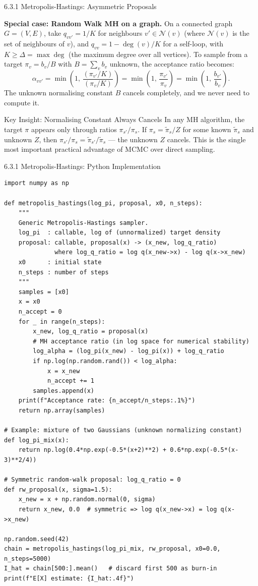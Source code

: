 \documentclass[aspectratio=169,10pt]{beamer}
\begin{document}
\begin{frame}[allowframebreaks]{6.3.1 Metropolis-Hastings: Asymmetric Proposals}
\framebreak

\textbf{Special case: Random Walk MH on a graph.}
On a connected graph $G = (V,E)$, take $q_{vv'} = 1/K$ for neighbours $v' \in \mathcal{N}(v)$ (where $\mathcal{N}(v)$ is the set of neighbours of $v$), and $q_{vv} = 1 - \deg(v)/K$ for a self-loop, with $K \ge \Delta = \max\deg$ (the maximum degree over all vertices).
To sample from a target $\pi_v = b_v/B$ with $B = \sum_v b_v$ unknown, the acceptance ratio becomes:
\[
  \alpha_{vv'} = \min\!\left(1,\, \frac{(\pi_{v'}/K)}{(\pi_v/K)}\right) = \min\!\left(1,\, \frac{\pi_{v'}}{\pi_v}\right) = \min\!\left(1,\, \frac{b_{v'}}{b_v}\right).
\]
The unknown normalising constant $B$ cancels completely, and we never need to compute it.

\begin{alertblock}{Key Insight: Normalising Constant Always Cancels}
In any MH algorithm, the target $\pi$ appears only through ratios $\pi_{s'}/\pi_s$.
If $\pi_s = \tilde\pi_s / Z$ for some known $\tilde\pi_s$ and unknown $Z$, then $\pi_{s'}/\pi_s = \tilde\pi_{s'}/\tilde\pi_s$ --- the unknown $Z$ cancels.
This is the single most important practical advantage of MCMC over direct sampling.
\end{alertblock}

\end{frame}

\begin{frame}[fragile]{6.3.1 Metropolis-Hastings: Python Implementation}
\begin{lstlisting}[style=python]
import numpy as np

def metropolis_hastings(log_pi, proposal, x0, n_steps):
    """
    Generic Metropolis-Hastings sampler.
    log_pi  : callable, log of (unnormalized) target density
    proposal: callable, proposal(x) -> (x_new, log_q_ratio)
              where log_q_ratio = log q(x_new->x) - log q(x->x_new)
    x0      : initial state
    n_steps : number of steps
    """
    samples = [x0]
    x = x0
    n_accept = 0
    for _ in range(n_steps):
        x_new, log_q_ratio = proposal(x)
        # MH acceptance ratio (in log space for numerical stability)
        log_alpha = (log_pi(x_new) - log_pi(x)) + log_q_ratio
        if np.log(np.random.rand()) < log_alpha:
            x = x_new
            n_accept += 1
        samples.append(x)
    print(f"Acceptance rate: {n_accept/n_steps:.1%}")
    return np.array(samples)

# Example: mixture of two Gaussians (unknown normalizing constant)
def log_pi_mix(x):
    return np.log(0.4*np.exp(-0.5*(x+2)**2) + 0.6*np.exp(-0.5*(x-3)**2/4))

# Symmetric random-walk proposal: log_q_ratio = 0
def rw_proposal(x, sigma=1.5):
    x_new = x + np.random.normal(0, sigma)
    return x_new, 0.0  # symmetric => log q(x_new->x) = log q(x->x_new)

np.random.seed(42)
chain = metropolis_hastings(log_pi_mix, rw_proposal, x0=0.0, n_steps=5000)
I_hat = chain[500:].mean()   # discard first 500 as burn-in
print(f"E[X] estimate: {I_hat:.4f}")
\end{lstlisting}
\end{frame}
\end{document}
